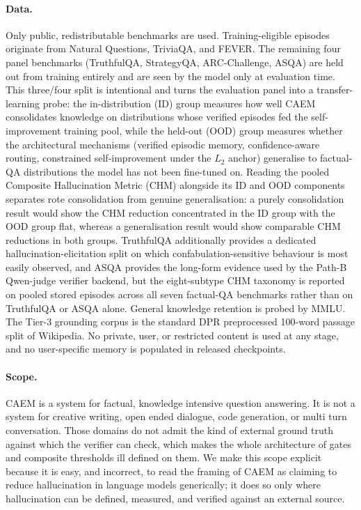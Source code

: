 \paragraph{Data.} Only public, redistributable benchmarks are used. Training-eligible episodes originate from Natural Questions, TriviaQA, and FEVER. The remaining four panel benchmarks (TruthfulQA, StrategyQA, ARC-Challenge, ASQA) are held out from training entirely and are seen by the model only at evaluation time. This three/four split is intentional and turns the evaluation panel into a transfer-learning probe: the in-distribution (ID) group measures how well CAEM consolidates knowledge on distributions whose verified episodes fed the self-improvement training pool, while the held-out (OOD) group measures whether the architectural mechanisms (verified episodic memory, confidence-aware routing, constrained self-improvement under the $L_{2}$ anchor) generalise to factual-QA distributions the model has not been fine-tuned on. Reading the pooled Composite Hallucination Metric (CHM) alongside its ID and OOD components separates rote consolidation from genuine generalisation: a purely consolidation result would show the CHM reduction concentrated in the ID group with the OOD group flat, whereas a generalisation result would show comparable CHM reductions in both groups. TruthfulQA additionally provides a dedicated hallucination-elicitation split on which confabulation-sensitive behaviour is most easily observed, and ASQA provides the long-form evidence used by the Path-B Qwen-judge verifier backend, but the eight-subtype CHM taxonomy is reported on pooled stored episodes across all seven factual-QA benchmarks rather than on TruthfulQA or ASQA alone. General knowledge retention is probed by MMLU. The Tier-3 grounding corpus is the standard DPR preprocessed 100-word passage split of Wikipedia. No private, user, or restricted content is used at any stage, and no user-specific memory is populated in released checkpoints.

\paragraph{Scope.} CAEM is a system for factual, knowledge intensive question answering. It is not a system for creative writing, open ended dialogue, code generation, or multi turn conversation. Those domains do not admit the kind of external ground truth against which the verifier can check, which makes the whole architecture of gates and composite thresholds ill defined on them. We make this scope explicit because it is easy, and incorrect, to read the framing of CAEM as claiming to reduce hallucination in language models generically; it does so only where hallucination can be defined, measured, and verified against an external source.

